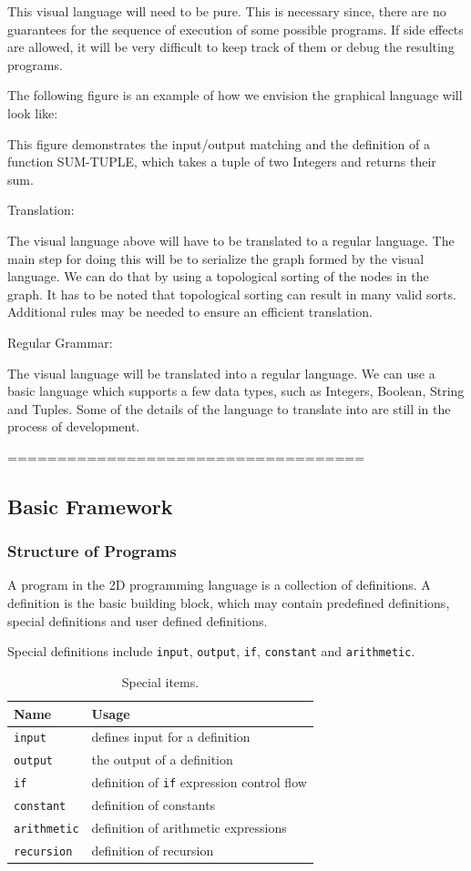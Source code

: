 \documentclass[12pt,UTF8,a4]{article}
\newcommand{\code}[1]{\texttt{#1}}
\begin{document}
This visual language will need to be pure. This is necessary since,
there are no guarantees for the sequence of execution of some possible
programs. If side effects are allowed, it will be very difficult to
keep track of them or debug the resulting programs.

The following figure is an example of how we envision the graphical
language will look like:

This figure demonstrates the input/output matching and the definition
of a function SUM-TUPLE, which takes a tuple of two Integers and
returns their sum.

Translation:

The visual language above will have to be translated to a regular
language. The main step for doing this will be to serialize the graph
formed by the visual language. We can do that by using a topological
sorting of the nodes in the graph. It has to be noted that topological
sorting can result in many valid sorts. Additional rules may be needed
to ensure an efficient translation.


Regular Grammar:

The visual language will be translated into a regular language. We can use a basic language which  supports a few data types, such as Integers, Boolean, String and Tuples. Some of the details of the language to translate into are still in the process of development.

====================================

\subsection{Basic Framework}
\subsubsection{Structure of Programs}
A program in the 2D programming language is a collection of definitions. A definition is the basic building block, which may contain predefined definitions, special definitions and user defined definitions.

Special definitions include \code{input}, \code{output}, \code{if}, \code{constant} and \code{arithmetic}.
\begin{table}[!ht]
\center
\begin{tabular}{l|l}
\hline
Name & Usage \\
\hline
\code{input} & defines input for a definition\\
\code{output} & the output of a definition\\
\code{if} & definition of \code{if} expression control flow \\
\code{constant} & definition of constants \\
\code{arithmetic} & definition of arithmetic expressions \\
\code{recursion} & definition of recursion\\
\hline
\end{tabular}
\caption{Special items.}\label{tab:sitems}
\end{table}
\end{document}
